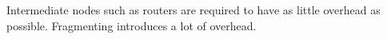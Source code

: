 Intermediate nodes such as routers are required to have as little overhead as possible. Fragmenting introduces a lot of overhead.
